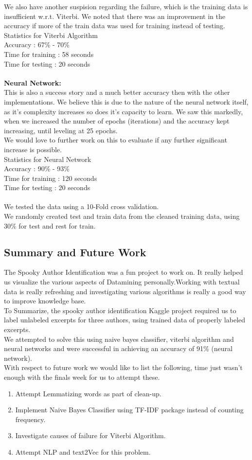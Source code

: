 \documentclass[fleqn,10pt]{SelfArx} %
\begin{document}
We also have another suspision regarding the failure, which is the training data is insufficient w.r.t. Viterbi. We noted that there was an improvement in the accuracy if more of the train data was used for training instead of testing.\\
Statistics for Viterbi Algorithm\\
Accuracy : 67\% - 70\% \\
Time for training : 58 seconds \\
Time for testing : 20 seconds \\
\\
\textbf{Neural Network: }\\
This is also a success story and a much better accuracy then with the other implementations. We believe this is due to the nature of the neural network itself, as it's complexity increases so does it's capacity to learn. We saw this markedly, when we increased the number of epochs (iterations) and the accuracy kept increasing, until leveling at 25 epochs.\\
We would love to further work on this to evaluate if any further significant increase is possible.\\
Statistics for Neural Network\\
Accuracy : 90\% - 93\% \\
Time for training : 120 seconds \\
Time for testing : 20 seconds \\
\\
We tested the data using a 10-Fold cross validation.\\
We randomly created test and train data from the cleaned training data, using 30\% for test and rest for train.\\
\subsection{Summary and Future Work}
The Spooky Author Identification was a fun project to work on. It really helped us visualize the various aspects of Datamining personally.Working with textual data is really refreshing and investigating various algorithms is really a good way to improve knowledge base.\\
To Summarize, the spooky author identification Kaggle project required us to label unlabeled excerpts for three authors, using trained data of properly labeled excerpts.\\
We attempted to solve this using naive bayes classifier, viterbi algorithm and neural networks and were successful in achieving an accuracy of 91\% (neural network).\\
With respect to future work we would like to list the following, time just wasn't enough with the finals week for us to attempt these.
\begin{enumerate}
	\item Attempt Lemmatizing words as part of clean-up.
	\item Implement Naive Bayes Classifier using TF-IDF package instead of counting frequency.
	\item Investigate causes of failure for Viterbi Algorithm.
	\item Attempt NLP and text2Vec for this problem.
\end{enumerate}
\end{document}
